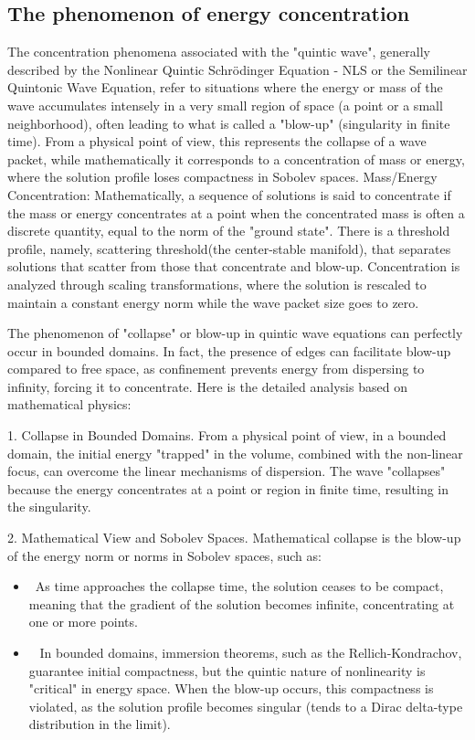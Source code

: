 \documentclass[11pt,letterpaper]{amsart}
\begin{document}
\subsection{The phenomenon of energy concentration}
The concentration phenomena associated with the "quintic wave", generally described by the Nonlinear Quintic Schrödinger Equation - NLS or the Semilinear Quintonic Wave Equation, refer to situations where the energy or mass of the wave accumulates intensely in a very small region of space (a point or a small neighborhood), often leading to what is called a "blow-up" (singularity in finite time). From a physical point of view, this represents the collapse of a wave packet, while mathematically it corresponds to a concentration of mass or energy, where the solution profile loses compactness in Sobolev spaces. Mass/Energy Concentration: Mathematically, a sequence of solutions is said to concentrate if the mass or energy concentrates at a point when the concentrated mass is often a discrete quantity, equal to the norm of the "ground state". There is a threshold profile, namely, scattering threshold(the center-stable manifold), that separates solutions that scatter from those that concentrate and blow-up.  Concentration is analyzed through scaling transformations, where the solution is rescaled to maintain a constant energy norm while the wave packet size goes to zero.

The phenomenon of "collapse" or blow-up in quintic wave equations  can perfectly occur in bounded domains. In fact, the presence of edges  can facilitate blow-up compared to free space, as confinement prevents energy from dispersing to infinity, forcing it to concentrate. Here is the detailed analysis based on mathematical physics:

1. Collapse in Bounded Domains.
From a physical point of view, in a bounded domain, the initial energy "trapped" in the volume, combined with the non-linear focus, can overcome the linear mechanisms of dispersion. The wave "collapses" because the energy concentrates at a point or region in finite time, resulting in the singularity.

2. Mathematical View and Sobolev Spaces.
Mathematical collapse is the blow-up of the energy norm or norms in Sobolev spaces, such as:

\begin{itemize}
\item~As time approaches the collapse time, the solution ceases to be compact, meaning that the gradient of the solution becomes infinite, concentrating at one or more points.

\item~ In bounded domains, immersion theorems, such as the Rellich-Kondrachov, guarantee initial compactness, but the quintic nature of nonlinearity is "critical" in energy space. When the blow-up occurs, this compactness is violated, as the solution profile becomes singular (tends to a Dirac delta-type distribution in the limit).
\end{itemize}
\end{document}

